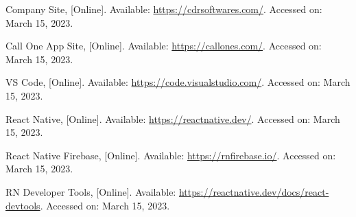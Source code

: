 \begin{thebibliography}{1}

    
    
    
    
    

    Company Site, [Online]. Available: \url{https://cdrsoftwares.com/}. Accessed on: March 15, 2023.

    Call One App Site, [Online]. Available: \url{https://callones.com/}. Accessed on: March 15, 2023.
    
    VS Code, [Online]. Available: \url{https://code.visualstudio.com/}. Accessed on: March 15, 2023.

    React Native, [Online]. Available: \url{https://reactnative.dev/}. Accessed on: March 15, 2023.

    React Native Firebase, [Online]. Available: \url{https://rnfirebase.io/}. Accessed on: March 15, 2023.

    RN Developer Tools, [Online]. Available: \url{https://reactnative.dev/docs/react-devtools}. Accessed on: March 15, 2023.


\end{thebibliography}
